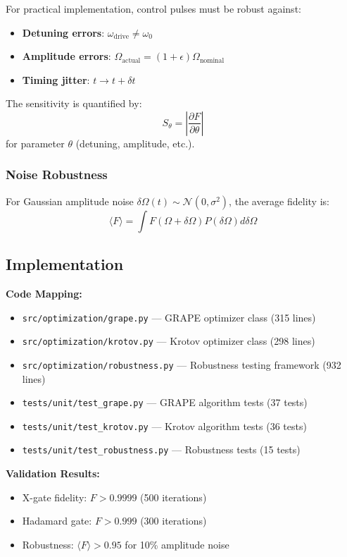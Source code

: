\documentclass[11pt,a4paper]{article}
\theoremstyle{definition}
\theoremstyle{remark}
\begin{document}
For practical implementation, control pulses must be robust against:
\begin{itemize}
    \item \textbf{Detuning errors}: $\omega_{\text{drive}} \neq \omega_0$
    \item \textbf{Amplitude errors}: $\Omega_{\text{actual}} = (1+\epsilon)\Omega_{\text{nominal}}$
    \item \textbf{Timing jitter}: $t \rightarrow t + \delta t$
\end{itemize}

The sensitivity is quantified by:
\begin{equation}
S_\theta = \left|\frac{\partial F}{\partial \theta}\right|
\end{equation}
for parameter $\theta$ (detuning, amplitude, etc.).

\subsubsection{Noise Robustness}

For Gaussian amplitude noise $\delta\Omega(t) \sim \mathcal{N}(0, \sigma^2)$, the average fidelity is:
\begin{equation}
\langle F \rangle = \int F(\Omega + \delta\Omega) P(\delta\Omega) d\delta\Omega
\end{equation}

\subsection{Implementation}

\textbf{Code Mapping:}
\begin{itemize}
    \item \texttt{src/optimization/grape.py} — GRAPE optimizer class (315 lines)
    \item \texttt{src/optimization/krotov.py} — Krotov optimizer class (298 lines)
    \item \texttt{src/optimization/robustness.py} — Robustness testing framework (932 lines)
    \item \texttt{tests/unit/test\_grape.py} — GRAPE algorithm tests (37 tests)
    \item \texttt{tests/unit/test\_krotov.py} — Krotov algorithm tests (36 tests)
    \item \texttt{tests/unit/test\_robustness.py} — Robustness tests (15 tests)
\end{itemize}

\textbf{Validation Results:}
\begin{itemize}
    \item X-gate fidelity: $F > 0.9999$ (500 iterations)
    \item Hadamard gate: $F > 0.999$ (300 iterations)
    \item Robustness: $\langle F \rangle > 0.95$ for 10\% amplitude noise
\end{itemize}
\end{document}
